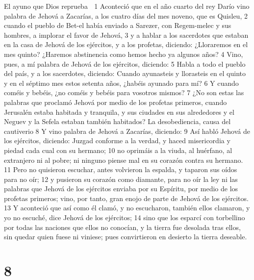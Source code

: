 El ayuno que Dios reprueba

1 Aconteció que en el año cuarto del rey Darío vino palabra de Jehová a Zacarías, a los cuatro días del mes noveno, que es Quisleu,
2 cuando el pueblo de Bet-el había enviado a Sarezer, con Regem-melec y sus hombres, a implorar el favor de Jehová,
3 y a hablar a los sacerdotes que estaban en la casa de Jehová de los ejércitos, y a los profetas, diciendo: ¿Lloraremos en el mes quinto? ¿Haremos abstinencia como hemos hecho ya algunos años?
4 Vino, pues, a mí palabra de Jehová de los ejércitos, diciendo:
5 Habla a todo el pueblo del país, y a los sacerdotes, diciendo: Cuando ayunasteis y llorasteis en el quinto y en el séptimo mes estos setenta años, ¿habéis ayunado para mí?
6 Y cuando coméis y bebéis, ¿no coméis y bebéis para vosotros mismos?
7 ¿No son estas las palabras que proclamó Jehová por medio de los profetas primeros, cuando Jerusalén estaba habitada y tranquila, y sus ciudades en sus alrededores y el Neguev y la Sefela estaban también habitados?
La desobediencia, causa del cautiverio
8 Y vino palabra de Jehová a Zacarías, diciendo:
9 Así habló Jehová de los ejércitos, diciendo: Juzgad conforme a la verdad, y haced misericordia y piedad cada cual con su hermano;
10 no oprimáis a la viuda, al huérfano, al extranjero ni al pobre; ni ninguno piense mal en su corazón contra su hermano.
11 Pero no quisieron escuchar, antes volvieron la espalda, y taparon sus oídos para no oír;
12 y pusieron su corazón como diamante, para no oír la ley ni las palabras que Jehová de los ejércitos enviaba por su Espíritu, por medio de los profetas primeros; vino, por tanto, gran enojo de parte de Jehová de los ejércitos. 
13 Y aconteció que así como él clamó, y no escucharon, también ellos clamaron, y yo no escuché, dice Jehová de los ejércitos;
14 sino que los esparcí con torbellino por todas las naciones que ellos no conocían, y la tierra fue desolada tras ellos, sin quedar quien fuese ni viniese; pues convirtieron en desierto la tierra deseable.

\chapter{8}

